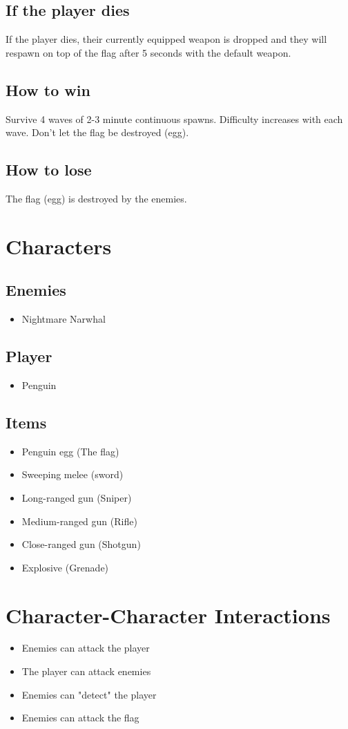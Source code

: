 \documentclass{article}
\begin{document}
\subsection{If the player dies}
If the player dies, their currently equipped weapon is dropped and they will respawn on top of the flag after 5 seconds with the default weapon.
\subsection{How to win}
Survive 4 waves of 2-3 minute continuous spawns. Difficulty increases with each wave. Don't let the flag be destroyed (egg).
\subsection{How to lose}
The flag (egg) is destroyed by the enemies.

\section{Characters}
\subsection{Enemies}
\begin{itemize}
\item Nightmare Narwhal
\end{itemize}
\subsection{Player}
\begin{itemize}
\item Penguin
\end{itemize}

\subsection{Items}
\begin{itemize}
\item Penguin egg (The flag)
\item Sweeping melee (sword)
\item Long-ranged gun (Sniper)
\item Medium-ranged gun (Rifle)
\item Close-ranged gun (Shotgun)
\item Explosive (Grenade)
\end{itemize}

\section{Character-Character Interactions}
\begin{itemize}
\item Enemies can attack the player
\item The player can attack enemies
\item Enemies can "detect" the player
\item Enemies can attack the flag

\end{itemize}
\end{document}
